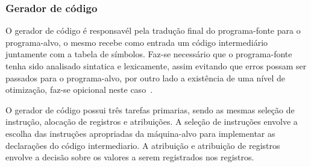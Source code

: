 
\subsubsection{Gerador de código}
\par
O gerador de código é responsavél pela tradução final do programa-fonte para o programa-alvo, o mesmo recebe como entrada um código intermediário juntamente com a tabela de símbolos. Faz-se necessário que o programa-fonte tenha sido analisado sintatica e lexicamente, assim evitando que erros possam ser passados para o programa-alvo, por outro lado a existência de uma nível de otimização, faz-se opicional neste caso~\cite{aho2007compilers}.

\par
O gerador de código possui três tarefas primarias, sendo as mesmas seleção de instrução, alocação de registros e atribuições. A seleção de instruções envolve a escolha das instruções apropriadas da máquina-alvo para implementar as declarações do código intermediario. A atribuição e atribuição de registros envolve a decisão sobre os valores a serem registrados nos registros\cite{aho2007compilers}.

